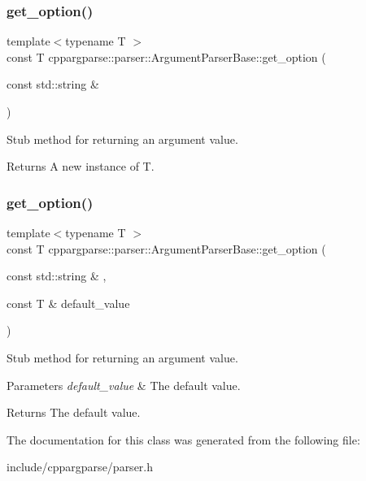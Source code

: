 \subsubsection{\texorpdfstring{get\+\_\+option()}{get\_option()}\hspace{0.1cm}{\footnotesize\ttfamily [1/2]}}
{\footnotesize\ttfamily template$<$typename T $>$ \\
const T cppargparse\+::parser\+::\+Argument\+Parser\+Base\+::get\+\_\+option (\begin{DoxyParamCaption}\item[{const std\+::string \&}]{ }\end{DoxyParamCaption})\hspace{0.3cm}{\ttfamily [inline]}}



Stub method for returning an argument value. 

\begin{DoxyReturn}{Returns}
A new instance of T. 
\end{DoxyReturn}
\mbox{\label{classcppargparse_1_1parser_1_1ArgumentParserBase_ad482db4f4cfafdd0a754d32dd3e36e51}} 
\subsubsection{\texorpdfstring{get\+\_\+option()}{get\_option()}\hspace{0.1cm}{\footnotesize\ttfamily [2/2]}}
{\footnotesize\ttfamily template$<$typename T $>$ \\
const T cppargparse\+::parser\+::\+Argument\+Parser\+Base\+::get\+\_\+option (\begin{DoxyParamCaption}\item[{const std\+::string \&}]{,  }\item[{const T \&}]{default\+\_\+value }\end{DoxyParamCaption})\hspace{0.3cm}{\ttfamily [inline]}}



Stub method for returning an argument value. 


\begin{DoxyParams}{Parameters}
{\em default\+\_\+value} & The default value.\\
\hline
\end{DoxyParams}
\begin{DoxyReturn}{Returns}
The default value. 
\end{DoxyReturn}


The documentation for this class was generated from the following file\+:\begin{DoxyCompactItemize}
\item 
include/cppargparse/parser.\+h\end{DoxyCompactItemize}
